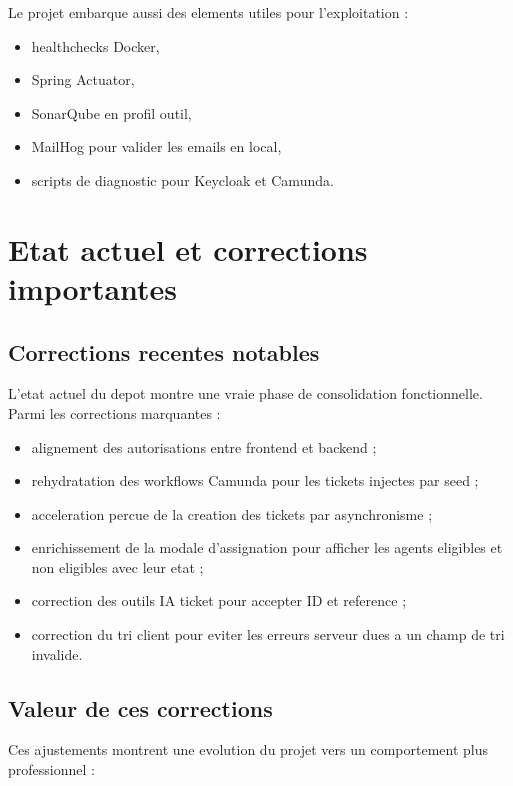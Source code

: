 \documentclass[12pt,a4paper]{article}
\begin{document}
Le projet embarque aussi des elements utiles pour l'exploitation :

\begin{itemize}[leftmargin=1.2cm]
  \item healthchecks Docker,
  \item Spring Actuator,
  \item SonarQube en profil outil,
  \item MailHog pour valider les emails en local,
  \item scripts de diagnostic pour Keycloak et Camunda.
\end{itemize}

\section{Etat actuel et corrections importantes}

\subsection{Corrections recentes notables}

L'etat actuel du depot montre une vraie phase de consolidation fonctionnelle. Parmi les corrections marquantes :

\begin{itemize}[leftmargin=1.2cm]
  \item alignement des autorisations entre frontend et backend ;
  \item rehydratation des workflows Camunda pour les tickets injectes par seed ;
  \item acceleration percue de la creation des tickets par asynchronisme ;
  \item enrichissement de la modale d'assignation pour afficher les agents eligibles et non eligibles avec leur etat ;
  \item correction des outils IA ticket pour accepter ID et reference ;
  \item correction du tri client pour eviter les erreurs serveur dues a un champ de tri invalide.
\end{itemize}

\subsection{Valeur de ces corrections}

Ces ajustements montrent une evolution du projet vers un comportement plus professionnel :
\end{document}
